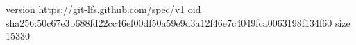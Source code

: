 version https://git-lfs.github.com/spec/v1
oid sha256:50c67e3b688fd22cc46ef00df50a59e9d3a12f46e7c4049fca0063198f134f60
size 15330
